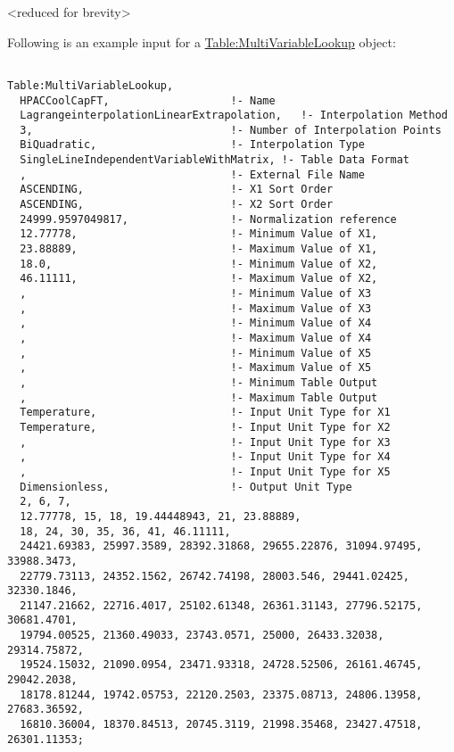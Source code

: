 \textless{}reduced for brevity\textgreater{}

Following is an example input for a \hyperref[tablemultivariablelookup]{Table:MultiVariableLookup} object:

\begin{lstlisting}

Table:MultiVariableLookup,
  HPACCoolCapFT,                   !- Name
  LagrangeinterpolationLinearExtrapolation,   !- Interpolation Method
  3,                               !- Number of Interpolation Points
  BiQuadratic,                     !- Interpolation Type
  SingleLineIndependentVariableWithMatrix, !- Table Data Format
  ,                                !- External File Name
  ASCENDING,                       !- X1 Sort Order
  ASCENDING,                       !- X2 Sort Order
  24999.9597049817,                !- Normalization reference
  12.77778,                        !- Minimum Value of X1,
  23.88889,                        !- Maximum Value of X1,
  18.0,                            !- Minimum Value of X2,
  46.11111,                        !- Maximum Value of X2,
  ,                                !- Minimum Value of X3
  ,                                !- Maximum Value of X3
  ,                                !- Minimum Value of X4
  ,                                !- Maximum Value of X4
  ,                                !- Minimum Value of X5
  ,                                !- Maximum Value of X5
  ,                                !- Minimum Table Output
  ,                                !- Maximum Table Output
  Temperature,                     !- Input Unit Type for X1
  Temperature,                     !- Input Unit Type for X2
  ,                                !- Input Unit Type for X3
  ,                                !- Input Unit Type for X4
  ,                                !- Input Unit Type for X5
  Dimensionless,                   !- Output Unit Type
  2, 6, 7,
  12.77778, 15, 18, 19.44448943, 21, 23.88889,
  18, 24, 30, 35, 36, 41, 46.11111,
  24421.69383, 25997.3589, 28392.31868, 29655.22876, 31094.97495, 33988.3473,
  22779.73113, 24352.1562, 26742.74198, 28003.546, 29441.02425, 32330.1846,
  21147.21662, 22716.4017, 25102.61348, 26361.31143, 27796.52175, 30681.4701,
  19794.00525, 21360.49033, 23743.0571, 25000, 26433.32038, 29314.75872,
  19524.15032, 21090.0954, 23471.93318, 24728.52506, 26161.46745, 29042.2038,
  18178.81244, 19742.05753, 22120.2503, 23375.08713, 24806.13958, 27683.36592,
  16810.36004, 18370.84513, 20745.3119, 21998.35468, 23427.47518, 26301.11353;
\end{lstlisting}

